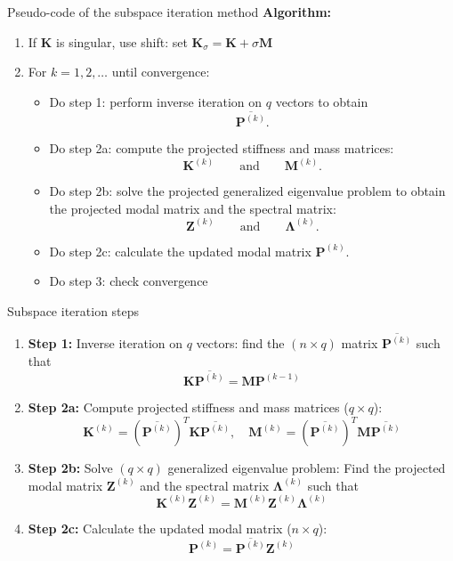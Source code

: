 \documentclass[aspectratio=169]{beamer}
\begin{document}
\begin{frame}{Pseudo-code of the subspace iteration method}
  \textbf{Algorithm:}
  \begin{enumerate}
    \item If $\mathbf K$ is singular, use shift: set \( \mathbf K_\sigma =\mathbf K + \sigma\mathbf M \)
    \item For \( k = 1, 2, \dots \) until convergence:
          \begin{itemize}
            \item Do step 1: perform inverse iteration on \( q \) vectors to obtain
                  $$\overline{\mathbf P^{(k)}}.$$
            \item Do step 2a: compute the projected stiffness and mass matrices:
                  $$\mathbf K^{(k)} \qquad\text{and}\qquad \mathbf M^{(k)}.$$
            \item Do step 2b: solve the projected generalized eigenvalue problem to obtain the projected modal matrix and the spectral matrix:
                  $$\mathbf Z^{(k)} \qquad\text{and}\qquad \mathbf \Lambda^{(k)}.$$

            \item Do step 2c: calculate the updated modal matrix \( \mathbf P^{(k)} \).
            \item Do step 3: check convergence
          \end{itemize}
  \end{enumerate}
\end{frame}


\begin{frame}{Subspace iteration steps}
  \begin{enumerate}
    \item \textbf{Step 1:} Inverse iteration on \( q \) vectors: find the $(n\times q)$ matrix $\overline{\mathbf P^{(k)}}$ such that
          \[
            \mathbf K\overline{\mathbf P^{(k)}} = \mathbf M\mathbf P^{(k-1)}
          \]
    \item \textbf{Step 2a:} Compute projected stiffness and mass matrices (\(q\times q\)):
          \[
            \mathbf K^{(k)} = (\overline{\mathbf P^{(k)}})^T \mathbf K \overline{\mathbf P^{(k)}}, \quad \mathbf M^{(k)} = (\overline{\mathbf P^{(k)}})^T \mathbf M \overline{\mathbf P^{(k)}}
          \]
    \item \textbf{Step 2b:} Solve $(q\times q)$ generalized eigenvalue problem: Find the projected modal matrix $\mathbf Z^{(k)}$ and the spectral matrix $\mathbf \Lambda^{(k)}$ such that
          \[
            \mathbf K^{(k)}\mathbf Z^{(k)} = \mathbf M^{(k)}\mathbf Z^{(k)} \mathbf \Lambda^{(k)}
          \]
    \item \textbf{Step 2c:} Calculate the updated modal matrix (\(n\times q\)):
          \[
            \mathbf P^{(k)} = \overline{\mathbf P^{(k)}} \mathbf Z^{(k)}
          \]
  \end{enumerate}
\end{frame}
\end{document}
